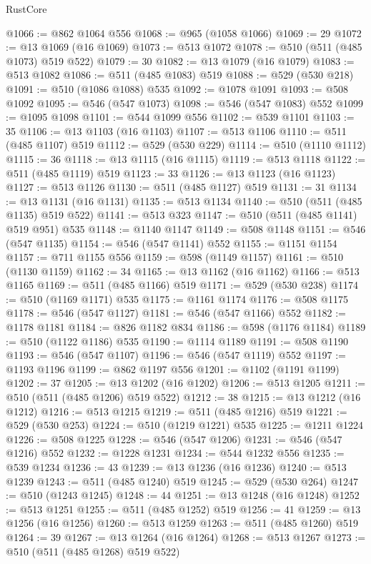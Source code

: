 \begin{lexlean}{RustCore}
\begin{coremodule}
@1066 := @862 @1064 @556
@1068 := @965 (@1058 @1066)
@1069 := 29
@1072 := @13 @1069 (@16 @1069)
@1073 := @513 @1072
@1078 := @510 (@511 (@485 @1073) @519 @522)
@1079 := 30
@1082 := @13 @1079 (@16 @1079)
@1083 := @513 @1082
@1086 := @511 (@485 @1083) @519
@1088 := @529 (@530 @218)
@1091 := @510 (@1086 @1088) @535
@1092 := @1078 @1091
@1093 := @508 @1092
@1095 := @546 (@547 @1073)
@1098 := @546 (@547 @1083) @552
@1099 := @1095 @1098
@1101 := @544 @1099 @556
@1102 := @539 @1101
@1103 := 35
@1106 := @13 @1103 (@16 @1103)
@1107 := @513 @1106
@1110 := @511 (@485 @1107) @519
@1112 := @529 (@530 @229)
@1114 := @510 (@1110 @1112)
@1115 := 36
@1118 := @13 @1115 (@16 @1115)
@1119 := @513 @1118
@1122 := @511 (@485 @1119) @519
@1123 := 33
@1126 := @13 @1123 (@16 @1123)
@1127 := @513 @1126
@1130 := @511 (@485 @1127) @519
@1131 := 31
@1134 := @13 @1131 (@16 @1131)
@1135 := @513 @1134
@1140 := @510 (@511 (@485 @1135) @519 @522)
@1141 := @513 @323
@1147 := @510 (@511 (@485 @1141) @519 @951) @535
@1148 := @1140 @1147
@1149 := @508 @1148
@1151 := @546 (@547 @1135)
@1154 := @546 (@547 @1141) @552
@1155 := @1151 @1154
@1157 := @711 @1155 @556
@1159 := @598 (@1149 @1157)
@1161 := @510 (@1130 @1159)
@1162 := 34
@1165 := @13 @1162 (@16 @1162)
@1166 := @513 @1165
@1169 := @511 (@485 @1166) @519
@1171 := @529 (@530 @238)
@1174 := @510 (@1169 @1171) @535
@1175 := @1161 @1174
@1176 := @508 @1175
@1178 := @546 (@547 @1127)
@1181 := @546 (@547 @1166) @552
@1182 := @1178 @1181
@1184 := @826 @1182 @834
@1186 := @598 (@1176 @1184)
@1189 := @510 (@1122 @1186) @535
@1190 := @1114 @1189
@1191 := @508 @1190
@1193 := @546 (@547 @1107)
@1196 := @546 (@547 @1119) @552
@1197 := @1193 @1196
@1199 := @862 @1197 @556
@1201 := @1102 (@1191 @1199)
@1202 := 37
@1205 := @13 @1202 (@16 @1202)
@1206 := @513 @1205
@1211 := @510 (@511 (@485 @1206) @519 @522)
@1212 := 38
@1215 := @13 @1212 (@16 @1212)
@1216 := @513 @1215
@1219 := @511 (@485 @1216) @519
@1221 := @529 (@530 @253)
@1224 := @510 (@1219 @1221) @535
@1225 := @1211 @1224
@1226 := @508 @1225
@1228 := @546 (@547 @1206)
@1231 := @546 (@547 @1216) @552
@1232 := @1228 @1231
@1234 := @544 @1232 @556
@1235 := @539 @1234
@1236 := 43
@1239 := @13 @1236 (@16 @1236)
@1240 := @513 @1239
@1243 := @511 (@485 @1240) @519
@1245 := @529 (@530 @264)
@1247 := @510 (@1243 @1245)
@1248 := 44
@1251 := @13 @1248 (@16 @1248)
@1252 := @513 @1251
@1255 := @511 (@485 @1252) @519
@1256 := 41
@1259 := @13 @1256 (@16 @1256)
@1260 := @513 @1259
@1263 := @511 (@485 @1260) @519
@1264 := 39
@1267 := @13 @1264 (@16 @1264)
@1268 := @513 @1267
@1273 := @510 (@511 (@485 @1268) @519 @522)

\end{coremodule}
\end{lexlean}
